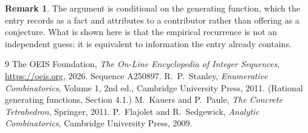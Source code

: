\documentclass[11pt,a4paper]{article}
\theoremstyle{plain}
\theoremstyle{definition}
\newtheorem{remark}[theorem]{Remark}
\begin{document}
\begin{remark}
The argument is conditional on the generating function, which the entry records as a fact and
attributes to a contributor rather than offering as a conjecture. What is shown here is that
the empirical recurrence is not an independent guess: it is equivalent to information the
entry already contains.
\end{remark}

\begin{thebibliography}{9}
 The OEIS Foundation, \emph{The On-Line Encyclopedia of Integer
Sequences}, \url{https://oeis.org}, 2026. Sequence A250897.
 R.~P.~Stanley, \emph{Enumerative Combinatorics}, Volume 1, 2nd ed.,
Cambridge University Press, 2011. (Rational generating functions, Section 4.1.)
 M.~Kauers and P.~Paule, \emph{The Concrete Tetrahedron}, Springer, 2011.
 P.~Flajolet and R.~Sedgewick, \emph{Analytic Combinatorics}, Cambridge
University Press, 2009.
\end{thebibliography}
\end{document}
